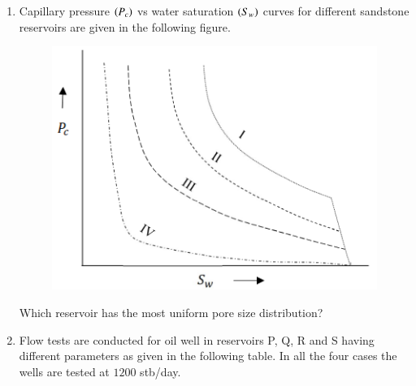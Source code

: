\documentclass[journal,12pt,onecolumn]{IEEEtran}
\theoremstyle{remark}
\begin{document}
\begin{enumerate}
\hfill{}

\begin{enumerate}
\end{enumerate}

\item Capillary pressure $\left(P_c\right)$ vs water saturation $\left(S_w\right)$ curves for different sandstone reservoirs  are given in the following figure.

\begin{figure}[h!]
  \centering
  \includegraphics[width=0.4\columnwidth]{figs/fig8.png} 
   \caption*{}
  \label{fig:Q39}
\end{figure}

Which reservoir has the most uniform pore size distribution?

\hfill{}

\begin{enumerate}
\end{enumerate}

\pagebreak

\item Flow tests are conducted for oil well in reservoirs P, Q, R and S having different parameters as given in the following table. In all the four cases the wells are tested at $1200$ stb/day.


\end{enumerate}
\end{document}
